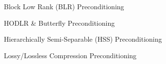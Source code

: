 
\begin{DoxyItemize}
\item Block Low Rank (BLR) Preconditioning
\item HODLR \& Butterfly Preconditioning
\item Hierarchically Semi-\/\+Separable (HSS) Preconditioning
\item Lossy/\+Lossless Compression Preconditioning 
\end{DoxyItemize}
